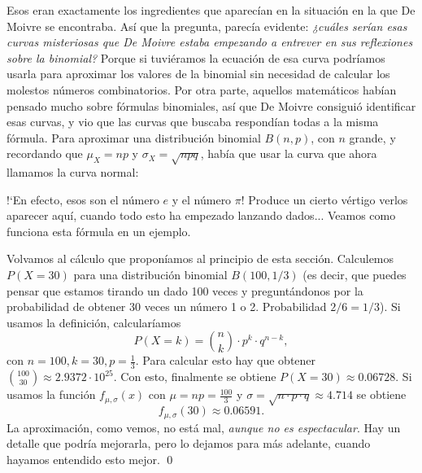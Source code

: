 Esos eran exactamente los ingredientes que aparecían en la situación en la que De Moivre se
encontraba. Así que la pregunta, parecía evidente: {\em ¿cuáles serían esas curvas misteriosas  que
De Moivre estaba empezando a entrever en sus reflexiones sobre la binomial?}  Porque si tuviéramos
la ecuación de esa curva podríamos usarla para aproximar los valores de la binomial sin necesidad
de calcular los molestos números combinatorios. Por otra parte, aquellos matemáticos habían pensado
mucho sobre fórmulas binomiales, así que De Moivre consiguió identificar esas curvas, y vio que las
curvas que buscaba respondían todas a la misma fórmula. Para aproximar una distribución
binomial $B(n,p)$, con $n$ grande, y recordando que $\mu_X=np$ y $\sigma_X=\sqrt{npq}$, había que
usar la curva que ahora llamamos la {\sf curva normal}:

    \begin{center}
    \end{center}
{!`}En efecto, esos son el número $e$ y el número $\pi$! Produce un cierto vértigo verlos aparecer aquí, cuando todo esto ha empezado lanzando dados... Veamos como funciona esta fórmula en un ejemplo.
    \begin{Ejemplo}
    \label{ejem:BinomialVsNormal}
    Volvamos al cálculo que proponíamos al principio de esta sección. Calculemos $P(X=30)$ para una distribución binomial $B(100,1/3)$ (es decir, que puedes pensar que estamos tirando un dado 100 veces y preguntándonos por la probabilidad de obtener 30 veces un número 1 o 2. Probabilidad $2/6=1/3$). Si usamos la definición, calcularíamos
   \[\displaystyle
   P(X=k)=\binom{n}{k}\cdot p^k\cdot q^{n-k},
   \]
   con $n=100, k=30, p=\frac{1}{3}$. Para calcular esto hay que obtener $\binom{100}{30}\approx 2.9372\cdot 10^{25}$. Con esto, finalmente se obtiene $P(X=30)\approx 0.06728$. Si usamos la función $f_{\mu,\sigma}(x)$ con $\mu=np=\frac{100}{3}$ y $\sigma=\sqrt{n\cdot p\cdot q}\approx4.714$ se obtiene
   \[f_{\mu,\sigma}(30)\approx 0.06591.\]
   La aproximación, como vemos, no está mal, {\em aunque no es espectacular}. Hay un detalle que podría mejorarla, pero lo dejamos para más adelante, cuando hayamos entendido esto mejor.
   \quad\qed
   \end{Ejemplo}


